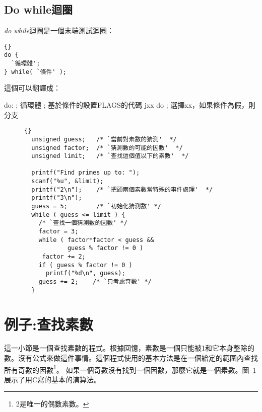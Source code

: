 \subsection{Do while迴圈}
\emph{do while}迴圈是一個末端測試迴圈：
\lstset{escapeinside=`',language=Pascal,%
}
\begin{lstlisting}[stepnumber=0]{}
do {
  `循環體';
} while( `條件' );
\end{lstlisting}
\noindent 這個可以翻譯成：
\begin{AsmCodeListing}[frame=none]
do:
      ; 循環體
      ; 基於條件的設置FLAGS的代碼
      jxx    do          ; 選擇xx，如果條件為假，則分支
\end{AsmCodeListing}


\begin{figure}[t]
\lstset{escapeinside=`',language=Pascal,%
}
\begin{lstlisting}[frame=tlrb]{}
  unsigned guess;   /* `當前對素數的猜測'  */
  unsigned factor;  /* `猜測數的可能的因數'  */
  unsigned limit;   /* `查找這個值以下的素數'  */

  printf("Find primes up to: ");
  scanf("%u", &limit);
  printf("2\n");    /* `把頭兩個素數當特殊的事件處理'  */
  printf("3\n");
  guess = 5;        /* `初始化猜測數' */
  while ( guess <= limit ) {
    /* `查找一個猜測數的因數' */
    factor = 3;
    while ( factor*factor < guess &&
            guess % factor != 0 )
     factor += 2;
    if ( guess % factor != 0 )
      printf("%d\n", guess);
    guess += 2;    /* `只考慮奇數' */
  }
\end{lstlisting}
\caption{}\label{fig:primec}
\end{figure}

\section{例子:查找素數}
這一小節是一個查找素數的程式。根據回憶，素數是一個只能被1和它本身整除的數。沒有公式來做這件事情。這個程式使用的基本方法是在一個給定的範圍內查找所有奇數的因數\footnote{2是唯一的偶數素數。}。
如果一個奇數沒有找到一個因數，那麼它就是一個素數。圖~\ref{fig:primec}
展示了用C寫的基本的演算法。

